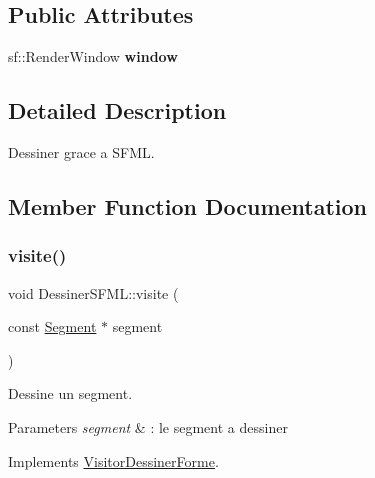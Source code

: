 \subsection*{Public Attributes}
\begin{DoxyCompactItemize}
\item 
\mbox{\label{class_dessiner_s_f_m_l_a0cdda71498416b55fe4aee1c4119a92f}} 
sf\+::\+Render\+Window {\bfseries window}
\end{DoxyCompactItemize}


\subsection{Detailed Description}
Dessiner grace a S\+F\+ML. 

\subsection{Member Function Documentation}
\mbox{\label{class_dessiner_s_f_m_l_a94dcb5037f1690eea6c38385065a68a8}} 
\subsubsection{\texorpdfstring{visite()}{visite()}\hspace{0.1cm}{\footnotesize\ttfamily [1/5]}}
{\footnotesize\ttfamily void Dessiner\+S\+F\+M\+L\+::visite (\begin{DoxyParamCaption}\item[{const \mbox{\hyperlink{class_segment}{Segment}} $\ast$}]{segment }\end{DoxyParamCaption})\hspace{0.3cm}{\ttfamily [virtual]}}



Dessine un segment. 


\begin{DoxyParams}{Parameters}
{\em segment} & \+: le segment a dessiner \\
\hline
\end{DoxyParams}


Implements \mbox{\hyperlink{class_visitor_dessiner_forme}{Visitor\+Dessiner\+Forme}}.

\mbox{\label{class_dessiner_s_f_m_l_accb8ed59253778163ecd3ca8b37e66de}} 
